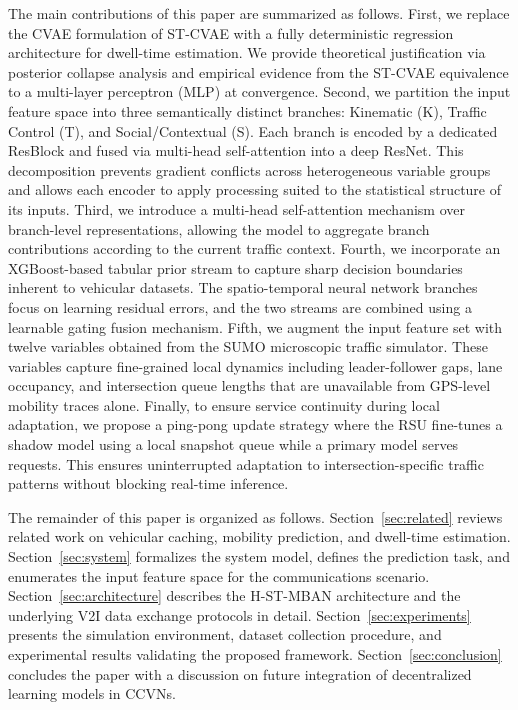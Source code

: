 \documentclass[journal]{IEEEtran}
\begin{document}
The main contributions of this paper are summarized as follows.
First, we replace the CVAE formulation of ST-CVAE with a fully deterministic regression architecture for dwell-time estimation.
We provide theoretical justification via posterior collapse analysis and empirical evidence from the ST-CVAE equivalence to a multi-layer perceptron (MLP) at convergence.
Second, we partition the input feature space into three semantically distinct branches: Kinematic (K), Traffic Control (T), and Social/Contextual (S).
Each branch is encoded by a dedicated ResBlock and fused via multi-head self-attention into a deep ResNet.
This decomposition prevents gradient conflicts across heterogeneous variable groups and allows each encoder to apply processing suited to the statistical structure of its inputs.
Third, we introduce a multi-head self-attention mechanism over branch-level representations, allowing the model to aggregate branch contributions according to the current traffic context.
Fourth, we incorporate an XGBoost-based tabular prior stream to capture sharp decision boundaries inherent to vehicular datasets.
The spatio-temporal neural network branches focus on learning residual errors, and the two streams are combined using a learnable gating fusion mechanism.
Fifth, we augment the input feature set with twelve variables obtained from the SUMO microscopic traffic simulator.
These variables capture fine-grained local dynamics including leader-follower gaps, lane occupancy, and intersection queue lengths that are unavailable from GPS-level mobility traces alone.
Finally, to ensure service continuity during local adaptation, we propose a ping-pong update strategy where the RSU fine-tunes a shadow model using a local snapshot queue while a primary model serves requests.
This ensures uninterrupted adaptation to intersection-specific traffic patterns without blocking real-time inference.

The remainder of this paper is organized as follows.
Section~\ref{sec:related} reviews related work on vehicular caching, mobility prediction, and dwell-time estimation.
Section~\ref{sec:system} formalizes the system model, defines the prediction task, and enumerates the input feature space for the communications scenario.
Section~\ref{sec:architecture} describes the H-ST-MBAN architecture and the underlying V2I data exchange protocols in detail.
Section~\ref{sec:experiments} presents the simulation environment, dataset collection procedure, and experimental results validating the proposed framework.
Section~\ref{sec:conclusion} concludes the paper with a discussion on future integration of decentralized learning models in CCVNs.
\end{document}
